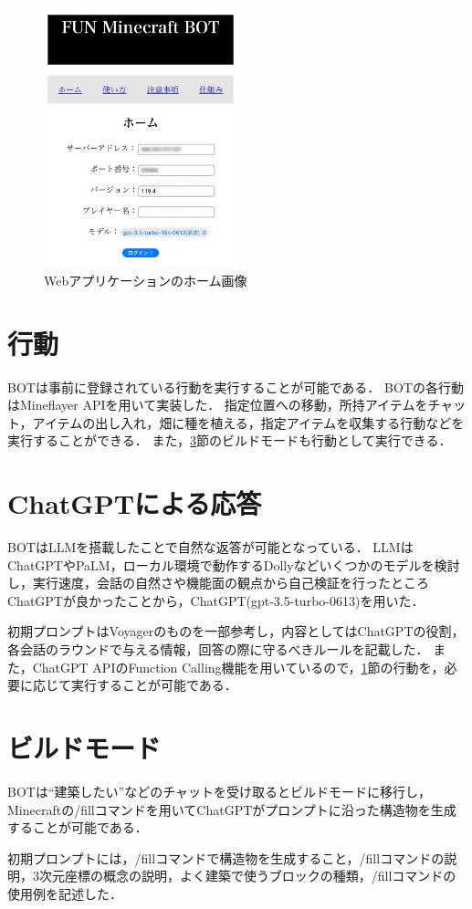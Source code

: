 \begin{figure}[H]
    \centering
    \includegraphics[width=0.5\textwidth]{fig/web_app.jpg}
    \caption{Webアプリケーションのホーム画像}
    \label{fig:web_app}
\end{figure}

\section{行動}\label{sec:act}
BOTは事前に登録されている行動を実行することが可能である．
BOTの各行動はMineflayer API\cite{bib:Mineflayer}を用いて実装した．
指定位置への移動，所持アイテムをチャット，アイテムの出し入れ，畑に種を植える，指定アイテムを収集する行動などを実行することができる．
また，\ref{sec:build_mode}節のビルドモードも行動として実行できる．

\section{ChatGPTによる応答}\label{sec:gpt_res}
BOTはLLMを搭載したことで自然な返答が可能となっている．
LLMはChatGPTやPaLM，ローカル環境で動作するDollyなどいくつかのモデルを検討し，実行速度，会話の自然さや機能面の観点から自己検証を行ったところChatGPTが良かったことから，ChatGPT(gpt-3.5-turbo-0613)を用いた．

初期プロンプトはVoyager\cite{bib:Voyager}のものを一部参考し，内容としてはChatGPTの役割，各会話のラウンドで与える情報，回答の際に守るべきルールを記載した．
また，ChatGPT APIのFunction Calling機能を用いているので，\ref{sec:act}節の行動を，必要に応じて実行することが可能である．

\section{ビルドモード}\label{sec:build_mode}
BOTは``建築したい''などのチャットを受け取るとビルドモードに移行し，Minecraftの/fillコマンドを用いてChatGPTがプロンプトに沿った構造物を生成することが可能である．

初期プロンプトには，/fillコマンドで構造物を生成すること，/fillコマンドの説明，3次元座標の概念の説明，よく建築で使うブロックの種類，/fillコマンドの使用例を記述した．
